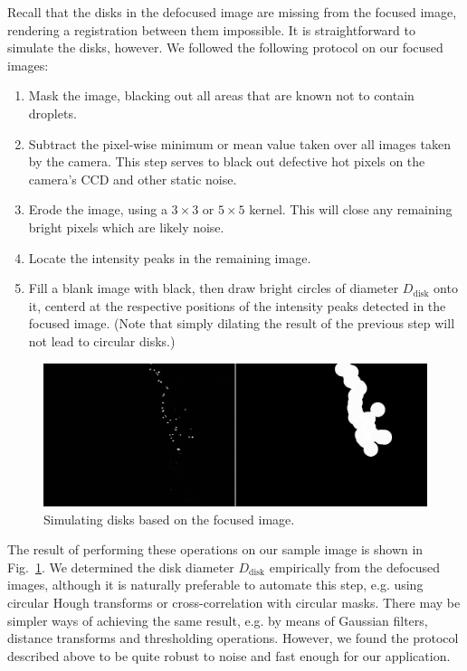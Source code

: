 \documentclass[11.5pt]{book}
\newcommand*{\figref}[1]{Fig.~\ref{#1}}
\begin{document}
Recall that the disks in the defocused image are missing from the focused image,
rendering a registration between them impossible. It is straightforward to
simulate the disks, however. We followed the following protocol on our focused
images:
\begin{enumerate}
    \item Mask the image, blacking out all areas that are known not to contain
        droplets.
    \item Subtract the pixel-wise minimum or mean value taken over all images
        taken by the camera. This step serves to black out defective hot pixels
        on the camera's CCD and other static noise.
    \item Erode the image, using a $3\times 3$ or $5\times 5$ kernel. This will
        close any remaining bright pixels which are likely noise.
    \item Locate the intensity peaks in the remaining image.
    \item Fill a blank image with black, then draw bright circles of diameter
        $D_\text{disk}$ onto it, centerd at the respective positions of the
        intensity peaks detected in the focused image. (Note that simply dilating
        the result of the previous step will not lead to circular disks.)
\end{enumerate}
\begin{figure}
    \centering
    \includegraphics[width=\textwidth]{img/orb/dilation.jpg}
    \caption{Simulating disks based on the focused image. \label{fig:making-disks}}
\end{figure}

The result of performing these operations on our sample image is shown in \figref{fig:making-disks}. We determined the disk diameter $D_\text{disk}$
empirically from the defocused images, although it is naturally preferable to
automate this step, e.g. using circular Hough transforms or cross-correlation
with circular masks. There may be simpler ways of achieving the same result,
e.g. by means of Gaussian filters, distance transforms and thresholding
operations. However, we found the protocol described above to be quite robust to
noise and fast enough for our application.
\end{document}
